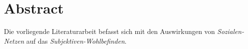 %
%

\thispagestyle{empty}
\chapter*{Abstract}\label{abstract}
Die vorliegende Literaturarbeit befasst sich mit den Auswirkungen von \textit{Sozialen-Netzen} auf das \textit{Subjektiven-Wohlbefinden}.

